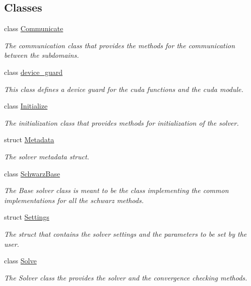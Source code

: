 \subsection*{Classes}
\begin{DoxyCompactItemize}
\item 
class \hyperlink{classSchwarzWrappers_1_1Communicate}{Communicate}
\begin{DoxyCompactList}\small\item\em The communication class that provides the methods for the communication between the subdomains. \end{DoxyCompactList}\item 
class \hyperlink{classSchwarzWrappers_1_1device__guard}{device\+\_\+guard}
\begin{DoxyCompactList}\small\item\em This class defines a device guard for the cuda functions and the cuda module. \end{DoxyCompactList}\item 
class \hyperlink{classSchwarzWrappers_1_1Initialize}{Initialize}
\begin{DoxyCompactList}\small\item\em The initialization class that provides methods for initialization of the solver. \end{DoxyCompactList}\item 
struct \hyperlink{structSchwarzWrappers_1_1Metadata}{Metadata}
\begin{DoxyCompactList}\small\item\em The solver metadata struct. \end{DoxyCompactList}\item 
class \hyperlink{classSchwarzWrappers_1_1SchwarzBase}{Schwarz\+Base}
\begin{DoxyCompactList}\small\item\em The Base solver class is meant to be the class implementing the common implementations for all the schwarz methods. \end{DoxyCompactList}\item 
struct \hyperlink{structSchwarzWrappers_1_1Settings}{Settings}
\begin{DoxyCompactList}\small\item\em The struct that contains the solver settings and the parameters to be set by the user. \end{DoxyCompactList}\item 
class \hyperlink{classSchwarzWrappers_1_1Solve}{Solve}
\begin{DoxyCompactList}\small\item\em The Solver class the provides the solver and the convergence checking methods. \end{DoxyCompactList}\item 

\end{DoxyCompactItemize}
